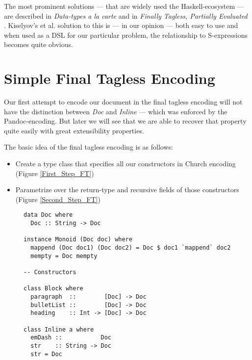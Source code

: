 \documentclass[format=acmsmall, review=true, screen=true, natbib=false]{acmart}
\begin{document}
The most prominent solutions — that are widely used the Haskell-ecosystem — are
described in \emph{Data-types a la carte} \cite{data-types-a-la-carte} and in
\emph{Finally Tagless, Partially Evaluated} \cite{finally-tagless}. Kiselyov’s
et al. solution to this is — in our opinion — both easy to use and when used as
a DSL for our particular problem, the relationship to S-expressions becomes
quite obvious.


\section{Simple Final Tagless Encoding}
\label{sec:org6195637}

Our first attempt to encode our document in the final tagless encoding will not
have the distinction between \emph{Doc} and \emph{Inline} — which was enforced by the
Pandoc-encoding. But later we will see that we are able to recover that property
quite easily with great extensibility properties.

The basic idea of the final tagless encoding is as follows:

\begin{itemize}
\item Create a type class that specifies all our constructors in Church encoding
(Figure \ref{First_Step_FT})
\item Parametrize over the return-type and recursive fields of those constructors
(Figure \ref{Second_Step_FT})
\end{itemize}

\begin{figure}
\begin{lstlisting}
data Doc where
  Doc :: String -> Doc

instance Monoid (Doc doc) where
  mappend (Doc doc1) (Doc doc2) = Doc $ doc1 `mappend` doc2
  mempty = Doc mempty

-- Constructors

class Block where
  paragraph  ::        [Doc] -> Doc
  bulletList ::        [Doc] -> Doc
  heading    :: Int -> [Doc] -> Doc

class Inline a where
  emDash ::           Doc
  str    :: String -> Doc
  str = Doc
\end{lstlisting}
\end{figure}
\end{document}
